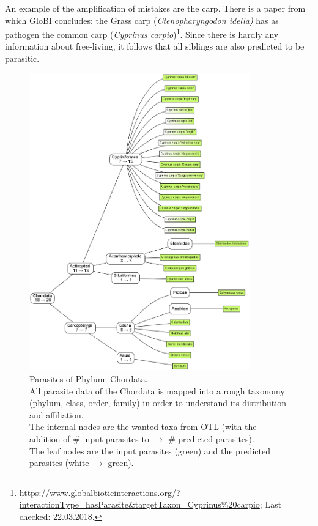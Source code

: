     An example of the amplification of mistakes are the carp. There is a paper from which GloBI 
      concludes: the Grass carp (\textit{Ctenopharyngodon idella)} has as pathogen the common carp 
      (\textit{Cyprinus carpio})\footnote{
        \hyperlink{https://www.globalbioticinteractions.org/?interactionType=hasParasite&targetTaxon=Cyprinus\%20carpio}
        {https://www.globalbioticinteractions.org/?interactionType=hasParasite\&targetTaxon=Cyprinus\%20carpio};
        Last checked: 22.03.2018.
      }. Since there is hardly any information about free-living, it follows that all siblings are 
      also predicted to be parasitic.

    \begin{figure}[h!]
      \centering
      \includegraphics[trim = 0mm 0mm 0mm 0mm, clip, width=0.85\textwidth]{Figures/ChordataParasites.png}
      \caption{Parasites of Phylum: Chordata. \\
        All parasite data of the Chordata is mapped into a rough taxonomy (phylum, class, order, 
          family) in order to understand its distribution and affiliation. \\
        The internal nodes are the wanted taxa from OTL (with the addition of \# input parasites to 
          $\rightarrow$ \# predicted parasites). \\
        The leaf nodes are the input parasites (green) and the predicted parasites (white $\rightarrow$ 
          green).}
      \label{fig:ChordataParasites}
    \end{figure}

